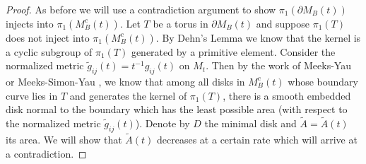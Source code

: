 \begin{proof}
As before we will use a contradiction argument to show
$\pi_1(\partial M_B(t))$ injects into $\pi_1(M^c_B(t))$. Let $T$
be a torus in $\partial M_B(t)$ and suppose $\pi_1(T)$ does not
inject into $\pi_1(M^c_B(t))$. By Dehn's Lemma we know that the
kernel is a cyclic subgroup of $\pi_1(T)$ generated by a primitive
element. Consider the normalized metric
$\widetilde{g}_{ij}(t)=t^{-1}g_{ij}(t)$ on $M_t$. Then by the work
of Meeks-Yau \cite{MY} or Meeks-Simon-Yau \cite{MSY}, we know that
among all disks in $M^c_B(t)$ whose boundary curve lies in $T$ and
generates the kernel of $\pi_1(T)$, there is a smooth embedded
disk normal to the boundary which has the least possible area
(with respect to the normalized metric $\widetilde{g}_{ij}(t)$).
Denote by $D$ the minimal disk and
$\widetilde{A}=\widetilde{A}(t)$ its area. We will show that
$\widetilde{A}(t)$ decreases at a certain rate which will arrive
at a contradiction.


\end{proof}
